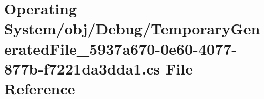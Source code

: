 \hypertarget{_operating_01_system_2obj_2_debug_2_temporary_generated_file__5937a670-0e60-4077-877b-f7221da3dda1_8cs}{}\section{Operating System/obj/\+Debug/\+Temporary\+Generated\+File\+\_\+5937a670-\/0e60-\/4077-\/877b-\/f7221da3dda1.cs File Reference}
\label{_operating_01_system_2obj_2_debug_2_temporary_generated_file__5937a670-0e60-4077-877b-f7221da3dda1_8cs}
